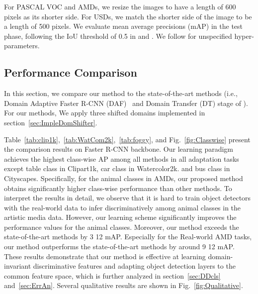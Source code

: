 \documentclass[10pt,twocolumn,letterpaper]{article}
\begin{document}
For PASCAL VOC and AMDs, we resize the images to have a length of 600 pixels as its shorter side.
For USDs, we match the shorter side of the image to be a length of 500 pixels. 
We evaluate mean average precisions (mAP) in the test phase, following the IoU threshold of 0.5 in \cite{Inoue_2018_CVPR} and \cite{Chen_2018_CVPR}.
We follow \cite{FasterR-CNN} for unspecified hyper-parameters.
\subsection{Performance Comparison}  \label{sec:PerformanceComparison}
In this section, we compare our method to the state-of-the-art methods (i.e., Domain Adaptive Faster R-CNN (DAF)~\cite{DAFRCNN} and Domain Transfer (DT) stage of \cite{Inoue_2018_CVPR}).
For our methods, We apply three shifted domains implemented in section~\ref{sec:ImpleDomShifter}.






Table~\ref{tab:clip1k},~\ref{tab:WatCom2k},~\ref{tab:foggy}, and Fig.~\ref{fig:Classwise} present the comparison results on Faster R-CNN backbone.
Our learning paradigm achieves the highest class-wise AP among all methods in all adaptation tasks except table class in Clipart1k, car class in Watercolor2k. and bus class in Cityscapes.
Specifically, for the animal classes in AMDs, our proposed method obtains significantly higher class-wise performance than other methods.
To interpret the results in detail, we observe that it is hard to train object detectors with the real-world data to infer discriminatively among animal classes in the artistic media data.
However, our learning scheme significantly improves the performance values for the animal classes.
Moreover, our method exceeds the state-of-the-art methods by 3  12 mAP.
Especially for the Real-world  AMD tasks, our method outperforms the state-of-the-art methods by around 9  12 mAP. 
These results demonstrate that our method is effective at learning domain-invariant discriminative features and adapting object detection layers to the common feature space, which is further analyzed in section~\ref{sec:DDcls} and~\ref{sec:ErrAn}.
Several qualitative results are shown in Fig.~\ref{fig:Qualitative}.
\end{document}
